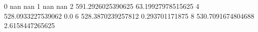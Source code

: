 0 nan nan
1 nan nan
2 591.2926025390625 63.19927978515625
4 528.0933227539062 0.0
6 528.3870239257812 0.293701171875
8 530.7091674804688 2.6158447265625
